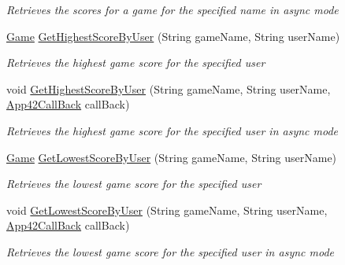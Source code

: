 \begin{DoxyCompactItemize}
\begin{DoxyCompactList}\small\item\em Retrieves the scores for a game for the specified name in async mode \end{DoxyCompactList}\item 
\hyperlink{classcom_1_1shephertz_1_1app42_1_1paas_1_1sdk_1_1csharp_1_1game_1_1_game}{Game} \hyperlink{classcom_1_1shephertz_1_1app42_1_1paas_1_1sdk_1_1csharp_1_1game_1_1_score_board_service_a5d30a2dd047f9989ecce94d94df84803}{Get\+Highest\+Score\+By\+User} (String game\+Name, String user\+Name)
\begin{DoxyCompactList}\small\item\em Retrieves the highest game score for the specified user \end{DoxyCompactList}\item 
void \hyperlink{classcom_1_1shephertz_1_1app42_1_1paas_1_1sdk_1_1csharp_1_1game_1_1_score_board_service_a724d29237195dabf6ba26ce70635e8ba}{Get\+Highest\+Score\+By\+User} (String game\+Name, String user\+Name, \hyperlink{interfacecom_1_1shephertz_1_1app42_1_1paas_1_1sdk_1_1csharp_1_1_app42_call_back}{App42\+Call\+Back} call\+Back)
\begin{DoxyCompactList}\small\item\em Retrieves the highest game score for the specified user in async mode \end{DoxyCompactList}\item 
\hyperlink{classcom_1_1shephertz_1_1app42_1_1paas_1_1sdk_1_1csharp_1_1game_1_1_game}{Game} \hyperlink{classcom_1_1shephertz_1_1app42_1_1paas_1_1sdk_1_1csharp_1_1game_1_1_score_board_service_a17698b8040c304fc7436a3e485dd127e}{Get\+Lowest\+Score\+By\+User} (String game\+Name, String user\+Name)
\begin{DoxyCompactList}\small\item\em Retrieves the lowest game score for the specified user \end{DoxyCompactList}\item 
void \hyperlink{classcom_1_1shephertz_1_1app42_1_1paas_1_1sdk_1_1csharp_1_1game_1_1_score_board_service_ab1ecbe4366d0b55655d286f60d27a6bb}{Get\+Lowest\+Score\+By\+User} (String game\+Name, String user\+Name, \hyperlink{interfacecom_1_1shephertz_1_1app42_1_1paas_1_1sdk_1_1csharp_1_1_app42_call_back}{App42\+Call\+Back} call\+Back)
\begin{DoxyCompactList}\small\item\em Retrieves the lowest game score for the specified user in async mode \end{DoxyCompactList}\item 

\end{DoxyCompactItemize}
